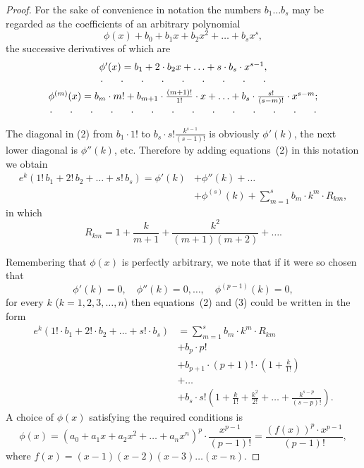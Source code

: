 \documentclass[a4paper,12pt]{book}[2004/02/16]
\providecommand{\colorbox}[2]{#2}
\newcommand{\correction}[2]{\colorbox{corr}{#1}}
\providecommand{\hyperlink}[2]{#2}
\providecommand{\hypertarget}[2]{#2}
\theoremstyle{ilemma}
\theoremstyle{itheorem}
\theoremstyle{iother}
\theoremstyle{icorollary}
\theoremstyle{numcorollary}
\theoremstyle{idefinition}
\begin{document}
\begin{proof}
For the sake of convenience in notation the numbers $b_1\ldots b_s$
may be regarded as the coefficients of an arbitrary polynomial
\[
  \phi(x) + b_0 + b_1x + b_2x^2 + \ldots
  + \mbox{\correction{$b_sx^s$}{$b_sx_s$}},
\]
the successive derivatives of which are
\begin{gather*}
\begin{array}{c}
  \phi'(x) = b_1 + 2\cdot b_2x + \ldots + s\cdot b_s \cdot x^{s-1},
\\
\hdotsfor[10]{1}
\end{array}
\\
\begin{array}{c}
  \phi^{(m)}(x) = b_m\cdot m! + b_{m+1} \cdot \frac{(m+1)!}{1!}\cdot x
+ \ldots + b_s\cdot \frac{s!}{(s-m)!} \cdot x^{s-m};
\\
\hdotsfor[10]{1}
\end{array}
\end{gather*}

The diagonal in \hyperlink{eq2p20}{(2)} from $\text{\correction{$b_1$}{$b$}}\cdot 1!$ to $b_s\cdot
s!\frac{k^{s-1}}{(s-1)!}$ is obviously $\phi'(k)$, the next lower
diagonal is $\phi''(k)$, etc. Therefore by adding equations~\hyperlink{eq2p20}{(2)} in
this notation we obtain
\hypertarget{eq3p21}{\begin{align*}
  e^k(1!\,b_1+2!\,b_2+\ldots+s!\,b_s)=\phi'(k) &+\phi''(k)+\ldots\\
  &+\phi^{(s)}(k)+\sum_{m=1}^sb_m\cdot k^m\cdot R_{km}, \tag{3}
\end{align*}}
in which
\[
  R_{km}=1+\frac{k}{m+1}+\frac{k^2}{(m+1)(m+2)}+ \ldots.
\]

Remembering that $\phi(x)$ is perfectly arbitrary, we note that if it
were so chosen that
\[
  \phi'(k)=0,\quad \phi''(k)=0,\ldots,\quad \phi^{(p-1)}(k)=0,
\]
for every $k$ ($k=1, 2, 3, \ldots, n$) then equations~\hyperlink{eq2p20}{(2)} and \hyperlink{eq3p21}{(3)}
could be written in the form
\hypertarget{eq4p21}{\begin{align*}
  e^k(1!\text{\correction{$\cdot$}{}} b_1+2!\cdot b_2+\ldots+s!\cdot b_s)
  & = \sum_{m=1}^sb_m\cdot k^m\cdot R_{km} \\
  & + b_p\cdot p! \\
  & + b_{p+1}\cdot (p+1)!\cdot \left(1+\frac{k}{1!}\right) \\
  & + \ldots \\
  & + b_s\cdot s!\left(1+\frac{k}{1!}+\frac{k^2}{2!}+\ldots
  +\frac{k^{s-p}}{\text{\correction{$(s-p)!$}{$(s-p)$}}}\right).
\tag{4}
\end{align*}}
A choice of $\phi(x)$ satisfying the required conditions is
\hypertarget{eq5p21}{\[
  \phi(x)=(a_0+a_1x+a_2x^2+ \ldots +a_nx^n)^p
  \cdot \frac{x^{p-1}}{(p-1)!}=\frac{(f(x))^p\cdot x^{p-1}}{(p-1)!},
\tag{5}
\]}
where $f(x) = (x-1)(x-2)(x-3) \ldots (x-n)$.


\end{proof}
\end{document}
